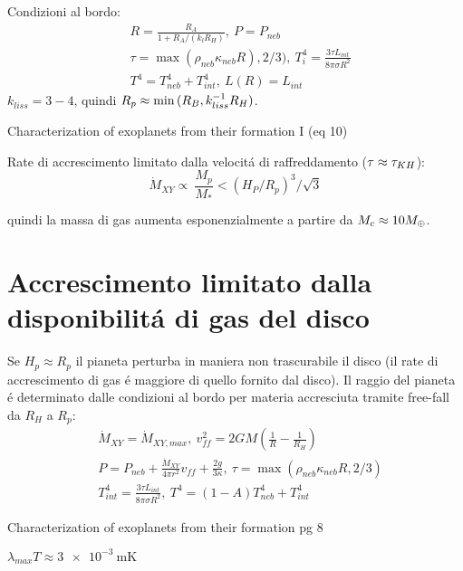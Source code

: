 Condizioni al bordo:
\begin{align}
&R=\frac{R_A}{1+R_A/(k_lR_H )},\ P=P_{neb}\\
&\tau=\max{(\rho_{neb}\kappa_{neb}R),2/3)},\ T_i^4=\frac{3\tau L_{int}}{8\pi\sigma R^2}\\
&T^4=T_{neb}^4+T_{int}^4,\ L(R)=L_{int}
\end{align}
$k_{liss}=3-4$, quindi $R_p\approx \min{(R_B,k_{liss}^{-1}R_H)}$.

\begin{workout}
Characterization of exoplanets from their formation I (eq 10)
\end{workout}

Rate di accrescimento limitato dalla velocit\'a di raffreddamento ($\tau\approx\tau_{KH}{}$):
\begin{equation}
\dot{M}_{XY}\propto\ \frac{M_p}{M_*}<(H_P/R_p)^3/\sqrt{3}
\end{equation}

quindi la massa di gas aumenta esponenzialmente a partire da $M_c\approx10M_{\oplus}{}$.

\section{Accrescimento limitato dalla disponibilit\'a di gas del disco}

Se $H_p\approx R_p$ il pianeta perturba in maniera non trascurabile il disco (il rate di accrescimento di gas \'e maggiore di quello fornito dal disco). Il raggio del pianeta \'e determinato dalle condizioni al bordo per materia accresciuta tramite free-fall da $R_H$ a $R_p$:
\begin{align}
&\dot{M}_{XY}=\dot{M}_{XY,max},\ v_{ff}^2=2GM(\frac{1}{R}-\frac{1}{R_H})\\
&P=P_{neb}+\frac{\dot{M}_{XY}}{4\pi r^2}v_{ff}+\frac{2g}{3\kappa},\ \tau=\max{(\rho_{neb}\kappa_{neb}R,2/3)}\\
&T_{int}^4=\frac{3\tau L_{int}}{8\pi\sigma R^2},\ T^4=(1-A)T_{neb}^4+T_{int}^4
\end{align}

\begin{workout}
Characterization of exoplanets from their formation pg 8
\end{workout}

\begin{workout}
$\lambda_{max}T\approx \SI{3e-3}{\meter\kelvin}$
\end{workout}

